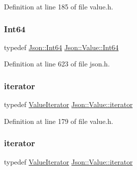 Definition at line 185 of file value.\+h.

\hypertarget{class_json_1_1_value_a1b86af9f85f0f1baa972c3319fa22695}{}\label{class_json_1_1_value_a1b86af9f85f0f1baa972c3319fa22695} 
\subsubsection{\texorpdfstring{Int64}{Int64}\hspace{0.1cm}{\footnotesize\ttfamily [2/2]}}
{\footnotesize\ttfamily typedef \hyperlink{namespace_json_ac62566f36fd33115957b91305c9ed1dc}{Json\+::\+Int64} \hyperlink{class_json_1_1_value_a1b86af9f85f0f1baa972c3319fa22695}{Json\+::\+Value\+::\+Int64}}



Definition at line 623 of file json.\+h.

\hypertarget{class_json_1_1_value_a341cdf2e01f8b3c5b7317aa2f0768c53}{}\label{class_json_1_1_value_a341cdf2e01f8b3c5b7317aa2f0768c53} 
\subsubsection{\texorpdfstring{iterator}{iterator}\hspace{0.1cm}{\footnotesize\ttfamily [1/2]}}
{\footnotesize\ttfamily typedef \hyperlink{class_json_1_1_value_iterator}{Value\+Iterator} \hyperlink{class_json_1_1_value_a341cdf2e01f8b3c5b7317aa2f0768c53}{Json\+::\+Value\+::iterator}}



Definition at line 179 of file value.\+h.

\hypertarget{class_json_1_1_value_a341cdf2e01f8b3c5b7317aa2f0768c53}{}\label{class_json_1_1_value_a341cdf2e01f8b3c5b7317aa2f0768c53} 
\subsubsection{\texorpdfstring{iterator}{iterator}\hspace{0.1cm}{\footnotesize\ttfamily [2/2]}}
{\footnotesize\ttfamily typedef \hyperlink{class_json_1_1_value_iterator}{Value\+Iterator} \hyperlink{class_json_1_1_value_a341cdf2e01f8b3c5b7317aa2f0768c53}{Json\+::\+Value\+::iterator}}



